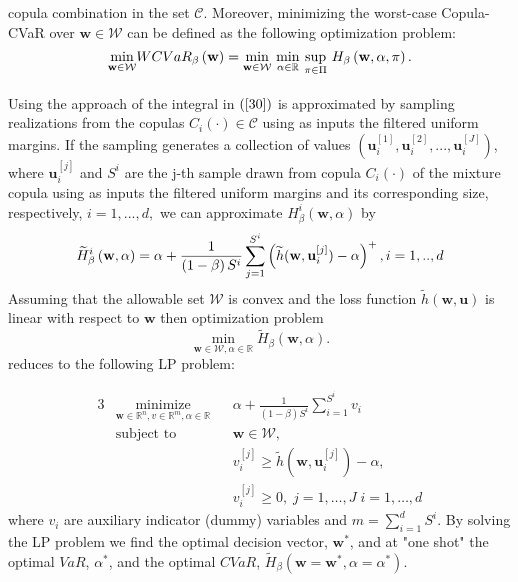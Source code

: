 \documentclass[a4paper,12pt]{report}
\begin{document}
copula combination in the set $\mathcal{C}$. Moreover, minimizing the
worst-case Copula-CVaR over $\mathbf{w}\in \mathcal{W}$ can be defined as
the following optimization problem:%
\begin{equation}
\underset{\mathbf{w}\in \mathcal{W}}{\min }WCVaR_{\beta }\left( \mathbf{w}%
\right) =\underset{}{\underset{\mathbf{w}\in \mathcal{W}}{\min }~\underset{%
		\alpha \in
		\mathbb{R}
	}{\min }~\underset{\pi \in \Pi }{\sup }}~H_{\beta }\left( \mathbf{w},\alpha
,\pi \right) .  \label{32}
\end{equation}%
Using the approach of \citet*{rockafellar2000} the integral in $\left( \ref%
{30}\right) $ is approximated by sampling realizations from the copulas $%
C_{i}\left( \cdot \right) \in \mathcal{C}$ using as inputs the filtered
uniform margins. If the sampling generates a collection of values $\left(
\mathbf{u}_{i}^{[1]},\mathbf{u}_{i}^{[2]},...,\mathbf{u}_{i}^{[J]}\right) $,
where $\mathbf{u}_{i}^{[j]}$ and $S^{i}$ are the j-th sample drawn from
copula $C_{i}\left( \cdot \right) $ of the mixture copula using as inputs
the filtered uniform margins and its corresponding size, respectively, $%
i=1,...,d,$ we can approximate $H_{\beta }^{i}\left( \mathbf{w},\alpha
\right) $ by
\begin{equation}
\widetilde{H}_{\beta }^{i}\left( \mathbf{w},\alpha \right) =\alpha +\frac{1}{%
	\left( 1-\beta \right) S^{i}}\sum_{j=1}^{S^{i}}\left( \widetilde{h}(\mathbf{w},\mathbf{u}%
_{i}^{[j]})-\alpha \right) ^{+},i=1,..,d
\end{equation}%
Assuming that the allowable set $\mathcal{W}$ is convex and the loss
function $\widetilde{h}\left( \mathbf{w,u}\right) $ is linear with respect to $\mathbf{w}
$ then optimization problem
\begin{equation}
\underset{\mathbf{w}\in \mathcal{W},\alpha \in
	\mathbb{R}
}{\min }\widetilde{H}_{\beta }\left( \mathbf{w},\alpha \right) .
\end{equation}%
reduces to the following LP problem:

\begin{alignat}{3}
& \underset{\mathbf{w}\in
	\mathbb{R}^{n},v\in
	\mathbb{R}^{m},\alpha \in
	\mathbb{R}}{\text{minimize}}
& & \alpha +\frac{1}{\left( 1-\beta \right)  S^{i}}\sum_{i=1}^{S^{i}}v_{i}
\\ 
& \text{subject to} 
& & \mathbf{w}\in \mathcal{W},\\
&&& v_{i}^{\left[ j\right] }\geq \widetilde{h}(\mathbf{w},\mathbf{u}_{i}^{[j]})-\alpha , \\
&&&v_{i}^{\left[ j\right] }\geq 0, \; j = 1, \ldots, J \;  i = 1, \ldots, d
\end{alignat}
where $v_{i}$ are auxiliary indicator (dummy) variables and $%
m=\sum_{i=1}^{d}S^{i}$. By solving the LP problem we find the optimal
decision vector, $\mathbf{w}^{\ast }$, and at "one shot" the optimal $VaR$, $%
\alpha ^{\ast }$, and the optimal $CVaR$, $\widetilde{H}_{\beta }\left(
\mathbf{w}=\mathbf{w}^{\ast },\alpha =\alpha ^{\ast }\right) $.
\end{document}
